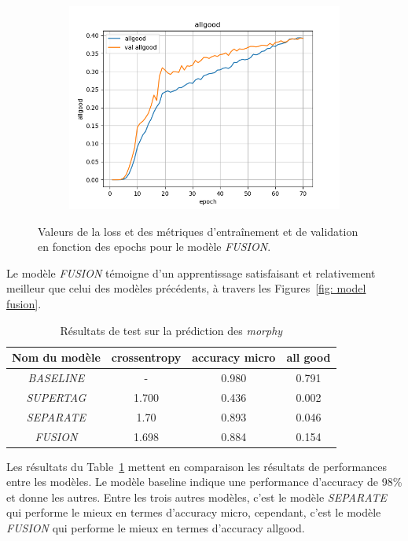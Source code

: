 \documentclass[a4paper]{article}
\begin{document}
\begin{figure}[H]
\begin{subfigure}{0.32\textwidth}
        \includegraphics[width=\linewidth]{../logs/fusion/allgood.png}
    \end{subfigure}
    \caption{Valeurs de la loss et des métriques d'entraînement et de validation en fonction des epochs 
            pour le modèle \textit{FUSION}.}
    \label{fig: results fusion}
\end{figure}

Le modèle \textit{FUSION} témoigne d'un apprentissage satisfaisant et relativement meilleur que celui des modèles précédents, à 
travers les Figures~\ref{fig: model fusion}.


\begin{table}[H]
    \centering
    \begin{tabular}{|c|c|c|c|}
        \hline
         Nom du modèle & crossentropy & accuracy micro & all good\\
         \hline
         \textit{BASELINE}& - & 0.980 & 0.791 \\
         \hline
         \textit{SUPERTAG}& 1.700 & 0.436 & 0.002\\
         \hline
         \textit{SEPARATE}& 1.70 & 0.893 & 0.046\\
         \hline
         \textit{FUSION}& 1.698 & 0.884 & 0.154 \\
         \hline
    \end{tabular}
    \caption{Résultats de test sur la prédiction des \textit{morphy}}
    \label{tab: test morphy}
\end{table}

Les résultats du Table~\ref{tab: test morphy} mettent en comparaison les résultats de performances entre les modèles.
Le modèle baseline indique une performance d'accuracy de 98\% et donne les autres.
Entre les trois autres modèles, c'est le modèle \textit{SEPARATE} qui performe le mieux en termes d’accuracy micro, cependant,
c'est le modèle \textit{FUSION} qui performe le mieux en termes d’accuracy allgood. 
\end{document}
